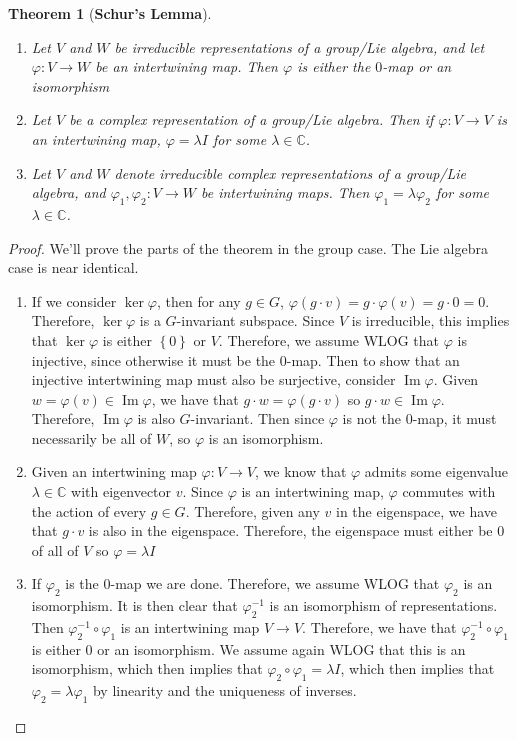 \documentclass[psamsfonts]{amsart}
\newtheorem{thm}{Theorem}[section]
\theoremstyle{definition}
\theoremstyle{remark}
\newcommand{\C}{\mathbb{C}}
\newcommand{\inv}{^{-1}}
\newcommand{\set}[1]{\left\lbrace#1 \right\rbrace}
\DeclareMathOperator{\im}{Im}
\begin{document}
\begin{thm}[\textbf{Schur's Lemma}]\ \\ \vspace{-\baselineskip}
\begin{enumerate}
\item Let $V$ and $W$ be irreducible representations of a group/Lie algebra, and let $\varphi: V \to W$ be an intertwining map. Then $\varphi$ is either the $0$-map or an isomorphism
\item Let $V$ be a complex representation of a group/Lie algebra. Then if $\varphi: V \to V$ is an intertwining map, $\varphi = \lambda I$ for some $\lambda \in \C$.
\item Let $V$ and $W$ denote irreducible complex representations of a group/Lie algebra, and $\varphi_1,\varphi_2: V \to W$ be intertwining maps. Then $\varphi_1 = \lambda \varphi_2$ for some $\lambda \in \C$.
\end{enumerate}
\end{thm}

\begin{proof}
We'll prove the parts of the theorem in the group case. The Lie algebra case is near identical. 
\begin{enumerate}
\item If we consider $\ker \varphi$, then for any $g \in G$, $\varphi(g \cdot v) = g\cdot \varphi(v) = g \cdot 0 = 0$. Therefore, $\ker \varphi$ is a $G$-invariant subspace. Since $V$ is irreducible, this implies that $\ker \varphi$ is either $\set{0}$ or $V$. Therefore, we assume WLOG that $\varphi$ is injective, since otherwise it must be the $0$-map. Then to show that an injective intertwining map must also be surjective, consider $\im\varphi$. Given $w = \varphi(v) \in \im \varphi$, we have that $g\cdot w = \varphi(g \cdot v)$ so $g \cdot w \in \im \varphi$. Therefore, $\im \varphi$ is also $G$-invariant. Then since $\varphi$ is not the $0$-map, it must necessarily be all of $W$, so $\varphi$ is an isomorphism.
\item Given an intertwining map $\varphi: V \to V$, we know that $\varphi$ admits some eigenvalue $\lambda \in \C$ with eigenvector $v$. Since $\varphi$ is an intertwining map, $\varphi$ commutes with the action of every $g \in G$. Therefore, given any $v$ in the eigenspace, we have that $g\cdot v$ is also in the eigenspace. Therefore, the eigenspace must either be $0$ of all of $V$ so $\varphi = \lambda I$
\item If $\varphi_2$ is the $0$-map we are done. Therefore, we assume WLOG that $\varphi_2$ is an isomorphism. It is then clear that $\varphi_2\inv$ is an isomorphism of representations. Then $\varphi_2\inv \circ \varphi_1$ is an intertwining map $V \to V$. Therefore, we have that $\varphi_2\inv \circ \varphi_1$ is either $0$ or an isomorphism. We assume again WLOG that this is an isomorphism, which then implies that $\varphi_2 \circ \varphi_1 = \lambda I$, which then implies that $\varphi_2 = \lambda \varphi_1$ by linearity and the uniqueness of inverses.
\end{enumerate}
\end{proof}


  
\end{document}
